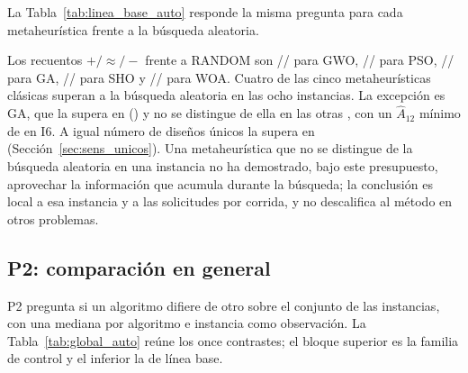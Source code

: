 La Tabla~\ref{tab:linea_base_auto} responde la misma pregunta para cada metaheurística frente a la búsqueda aleatoria.

\TablaLineaBaseAuto

Los recuentos $+/\approx/-$ frente a RANDOM son \BaseGwoPlus/\BaseGwoEqual/\BaseGwoMinus{} para GWO, \BasePsoPlus/\BasePsoEqual/\BasePsoMinus{} para PSO, \BaseGaPlus/\BaseGaEqual/\BaseGaMinus{} para GA, \BaseShoPlus/\BaseShoEqual/\BaseShoMinus{} para SHO y \BaseWoaPlus/\BaseWoaEqual/\BaseWoaMinus{} para WOA. Cuatro de las cinco metaheurísticas clásicas superan a la búsqueda aleatoria en las ocho instancias. La excepción es GA, que la supera en \BaseGaPlus{} (\BaseGaPlusInstances) y no se distingue de ella en las otras \BaseGaEqual, con un $\hat{A}_{12}$ mínimo de \BaseGaAMin{} en I6. A igual número de diseños únicos la supera en \UniqueBaseGaPlus{} (Sección~\ref{sec:sens_unicos}). Una metaheurística que no se distingue de la búsqueda aleatoria en una instancia no ha demostrado, bajo este presupuesto, aprovechar la información que acumula durante la búsqueda; la conclusión es local a esa instancia y a las \RequestsPerRun{} solicitudes por corrida, y no descalifica al método en otros problemas.

\subsection{P2: comparación en general}

P2 pregunta si un algoritmo difiere de otro sobre el conjunto de las instancias, con una mediana por algoritmo e instancia como observación. La Tabla~\ref{tab:global_auto} reúne los once contrastes; el bloque superior es la familia de control y el inferior la de línea base.

\TablaGlobalAuto

